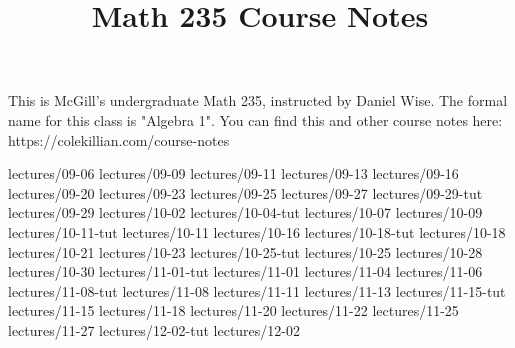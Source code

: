 \documentclass{scrartcl}
\title{Math 235 Course Notes}
\begin{document}
\maketitle

This is McGill’s undergraduate Math 235, instructed by Daniel Wise. The formal name for this class is "Algebra 1". You can find this and other course notes here: https://colekillian.com/course-notes

\tableofcontents




{lectures/09-06}
{lectures/09-09}
{lectures/09-11}
{lectures/09-13}
{lectures/09-16}
{lectures/09-20}
{lectures/09-23}
{lectures/09-25}
{lectures/09-27}
{lectures/09-29-tut}
{lectures/09-29}
{lectures/10-02}
{lectures/10-04-tut}
{lectures/10-07}
{lectures/10-09}
{lectures/10-11-tut}
{lectures/10-11}
{lectures/10-16}
{lectures/10-18-tut}
{lectures/10-18}
{lectures/10-21}
{lectures/10-23}
{lectures/10-25-tut}
{lectures/10-25}
{lectures/10-28}
{lectures/10-30}
{lectures/11-01-tut}
{lectures/11-01}
{lectures/11-04}
{lectures/11-06}
{lectures/11-08-tut}
{lectures/11-08}
{lectures/11-11}
{lectures/11-13}
{lectures/11-15-tut}
{lectures/11-15}
{lectures/11-18}
{lectures/11-20}
{lectures/11-22}
{lectures/11-25}
{lectures/11-27}
{lectures/12-02-tut}
{lectures/12-02}
\end{document}

